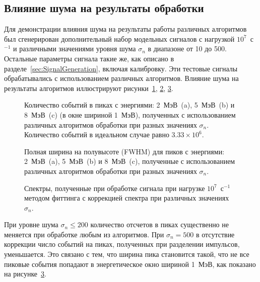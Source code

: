 
\subsection{Влияние шума на результаты обработки}

Для демонстрации влияния шума на результаты работы различных алгоритмов был сгенерирован дополнительный набор модельных сигналов с нагрузкой $10^7$~с${}^{-1}$ и различными значениями уровня шума $\sigma_n$ в диапазоне от 10 до 500. Остальные параметры сигнала такие же, как описано в разделе~\ref{sec:SignalGeneration}, включая калибровку. Эти тестовые сигналы обрабатывались с использованием различных алгоритмов. Влияние шума на результаты алгоритмов иллюстрируют рисунки~\ref{fig:processingNoiceByWindowCountRate}, \ref{fig:processingNoiceByWindowFwhm}, \ref{fig:processingSpectrumCmpByNoice}.

\begin{figure}[ht!]
  \caption{ Количество событий в пиках с энергиями: 2~МэВ~(a), 5~МэВ~(b) и 8~МэВ~(c) (в окне шириной 1~МэВ), полученных с использованием различных алгоритмов обработки при разных значениях $\sigma_n$. Количество событий в идеальном случае равно $3.33 \times 10^6$.~\cite{Khilkevitch2020} }
  \label{fig:processingNoiceByWindowCountRate}
\end{figure}


\begin{figure}[ht!]
  \caption{ Полная ширина на полувысоте (FWHM) для пиков с энергиями: 2~МэВ~(a), 5~МэВ~(b) и 8~МэВ~(c), полученные с использованием различных алгоритмов обработки при разных значениях $\sigma_n$.~\cite{Khilkevitch2020} }
  \label{fig:processingNoiceByWindowFwhm}
\end{figure}

\begin{figure}[ht!]
  \caption{ Спектры, полученные при обработке сигнала при нагрузке $10^7$~с${}^{-1}$ методом фиттинга с коррекцией спектра при различных значениях $\sigma_n$.~\cite{Khilkevitch2020} }
  \label{fig:processingSpectrumCmpByNoice}
\end{figure}


При уровне шума $\sigma_n \le 200$ количество отсчетов в пиках существенно не меняется при обработке любым из алгоритмов. При $\sigma_n = 500$ в отсутствие коррекции число событий на пиках, полученных при разделении импульсов, уменьшается. Это связано с тем, что ширина пика становится такой, что не все пиковые события попадают в энергетическое окно шириной 1~МэВ, как показано на рисунке~\ref{fig:processingSpectrumCmpByNoice}.

